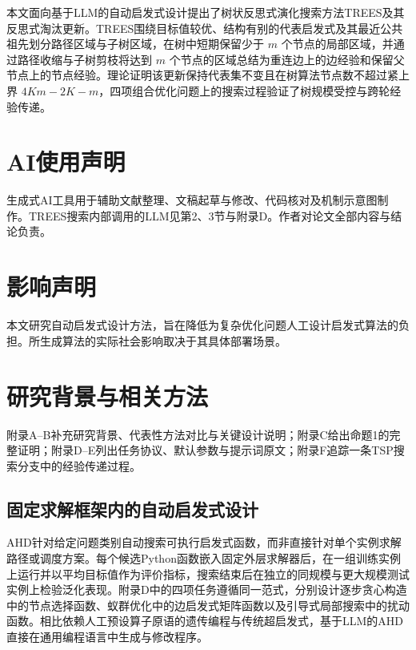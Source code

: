 \documentclass{article}
\begin{document}
本文面向基于LLM的自动启发式设计提出了树状反思式演化搜索方法TREES及其反思式淘汰更新。TREES围绕目标值较优、结构有别的代表启发式及其最近公共祖先划分路径区域与子树区域，在树中短期保留少于 \(m\) 个节点的局部区域，并通过路径收缩与子树剪枝将达到 \(m\) 个节点的区域总结为重连边上的边经验和保留父节点上的节点经验。理论证明该更新保持代表集不变且在树算法节点数不超过紧上界 \(4Km-2K-m\)，四项组合优化问题上的搜索过程验证了树规模受控与跨轮经验传递。

\section*{AI使用声明}\label{aiux4f7fux7528ux58f0ux660e}

生成式AI工具用于辅助文献整理、文稿起草与修改、代码核对及机制示意图制作。TREES搜索内部调用的LLM见第2、3节与附录D。作者对论文全部内容与结论负责。

\section*{影响声明}\label{ux5f71ux54cdux58f0ux660e}

本文研究自动启发式设计方法，旨在降低为复杂优化问题人工设计启发式算法的负担。所生成算法的实际社会影响取决于其具体部署场景。

\FloatBarrier
\label{evotrace-main-end}



\clearpage
\onecolumn
\raggedbottom
\appendix
\section{研究背景与相关方法}\label{ux7814ux7a76ux80ccux666fux4e0eux76f8ux5173ux65b9ux6cd5}

附录A--B补充研究背景、代表性方法对比与关键设计说明；附录C给出命题1的完整证明；附录D--E列出任务协议、默认参数与提示词原文；附录F追踪一条TSP搜索分支中的经验传递过程。

\subsection{固定求解框架内的自动启发式设计}\label{ux56faux5b9aux6c42ux89e3ux6846ux67b6ux5185ux7684ux81eaux52a8ux542fux53d1ux5f0fux8bbeux8ba1}

AHD针对给定问题类别自动搜索可执行启发式函数，而非直接针对单个实例求解路径或调度方案。每个候选Python函数嵌入固定外层求解器后，在一组训练实例上运行并以平均目标值作为评价指标，搜索结束后在独立的同规模与更大规模测试实例上检验泛化表现。附录D中的四项任务遵循同一范式，分别设计逐步贪心构造中的节点选择函数、蚁群优化中的边启发式矩阵函数以及引导式局部搜索中的扰动函数。相比依赖人工预设算子原语的遗传编程与传统超启发式\citep{koza, hh}，基于LLM的AHD直接在通用编程语言中生成与修改程序\citep{funsearch, eoh}。
\end{document}
